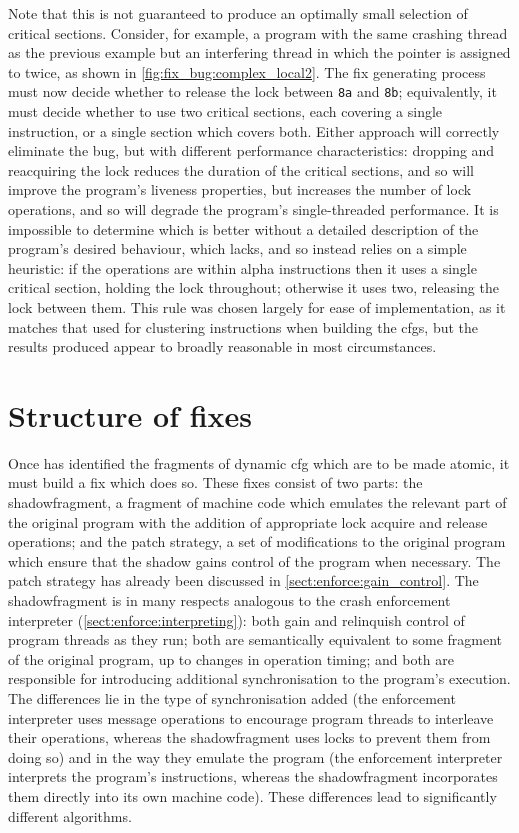 Note that this is not guaranteed to produce an optimally small
selection of critical sections.  Consider, for example, a program with
the same crashing thread as the previous example but an interfering
thread in which the pointer is assigned to twice, as shown in
\autoref{fig:fix_bug:complex_local2}.  The fix generating process must
now decide whether to release the lock between \texttt{8a} and
\texttt{8b}; equivalently, it must decide whether to use two critical
sections, each covering a single instruction, or a single section
which covers both.  Either approach will correctly eliminate the bug,
but with different performance characteristics: dropping and
reacquiring the lock reduces the duration of the critical sections,
and so will improve the program's liveness properties, but increases
the number of lock operations, and so will degrade the program's
single-threaded performance.  It is impossible to determine which is
better without a detailed description of the program's desired
behaviour, which {\technique} lacks, and so {\technique} instead
relies on a simple heuristic: if the operations are within \gls{alpha}
instructions then it uses a single critical section, holding the lock
throughout; otherwise it uses two, releasing the lock between them.
This rule was chosen largely for ease of implementation, as it matches
that used for clustering instructions when building the \glspl{cfg},
but the results produced appear to broadly reasonable in most
circumstances.

\section{Structure of fixes}

\noindent
Once {\technique} has identified the fragments of \gls{dynamic cfg}
which are to be made atomic, it must build a fix which does so.  These
fixes consist of two parts: the \gls{shadowfragment}, a fragment of
machine code which emulates the relevant part of the original program
with the addition of appropriate lock acquire and release operations;
and the patch strategy, a set of modifications to the original program
which ensure that the shadow gains control of the program when
necessary.  The patch strategy has already been discussed in
\autoref{sect:enforce:gain_control}.  The \gls{shadowfragment} is in
many respects analogous to the crash enforcement interpreter
(\autoref{sect:enforce:interpreting}): both gain and relinquish
control of program threads as they run; both are semantically
equivalent to some fragment of the original program, up to changes in
operation timing; and both are responsible for introducing additional
synchronisation to the program's execution.  The differences lie in
the type of synchronisation added (the enforcement interpreter uses
message operations to encourage program threads to interleave their
operations, whereas the \gls{shadowfragment} uses locks to prevent
them from doing so) and in the way they emulate the program (the
enforcement interpreter interprets the program's instructions, whereas
the \gls{shadowfragment} incorporates them directly into its own
machine code).  These differences lead to significantly different
algorithms.

